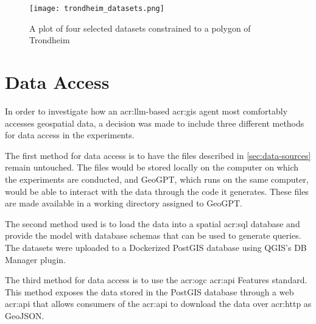 

\begin{figure}
    \centering
    \texttt{[image: trondheim\_datasets.png]}
    \caption{A plot of four selected datasets constrained to a polygon of Trondheim}
    \label{fig:datasets-trondheim}
\end{figure}

\section{Data Access}
\label{sec:data-access}


In order to investigate how an \acrshort{acr:llm}-based \acrshort{acr:gis} agent most comfortably accesses geospatial data, a decision was made to include three different methods for data access in the experiments.

The first method for data access is to have the files described in \autoref{sec:data-sources} remain untouched. The files would be stored locally on the computer on which the experiments are conducted, and GeoGPT, which runs on the same computer, would be able to interact with the data through the code it generates. These files are made available in a working directory assigned to GeoGPT.

The second method used is to load the data into a spatial \acrshort{acr:sql} database and provide the model with database schemas that can be used to generate queries. The datasets were uploaded to a Dockerized PostGIS database using QGIS's DB Manager plugin.

The third method for data access is to use the \acrshort{acr:ogc} \acrshort{acr:api} Features standard. This method exposes the data stored in the PostGIS database through a web \acrshort{acr:api} that allows consumers of the \acrshort{acr:api} to download the data over \acrshort{acr:http} as GeoJSON.

\glsresetall
